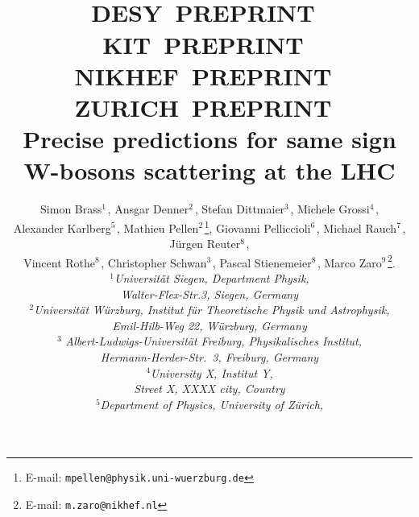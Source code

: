 \documentclass[11pt,epsf]{article}
\begin{document}
\title{\hfill ~\\[-30mm]
\phantom{h} \hfill\mbox{\small DESY PREPRINT } \\
\vspace{-10mm}
\phantom{h} \hfill\mbox{\small KIT PREPRINT } \\
\vspace{-10mm}
\phantom{h} \hfill\mbox{\small NIKHEF PREPRINT } \\
\vspace{-10mm}
\phantom{h} \hfill\mbox{\small ZURICH PREPRINT }
\\[1cm]
\textbf{Precise predictions for same sign W-bosons scattering at the LHC}}

\date{}
\author{
Simon Brass$^{1\,}$,
Ansgar Denner$^{2\,}$,
Stefan Dittmaier$^{3\,}$,
Michele Grossi$^{4\,}$, \\
Alexander Karlberg$^{5\,}$, 
Mathieu Pellen$^{2\,}$\footnote{E-mail:
  \texttt{mpellen@physik.uni-wuerzburg.de}},
Giovanni  Pelliccioli$^{6\,}$,
Michael Rauch$^{7\,}$,
J\"urgen Reuter$^{8\,}$, \\
Vincent Rothe$^{8\,}$, 
Christopher Schwan$^{3\,}$,
Pascal Stienemeier$^{8\,}$,
Marco Zaro$^{9\,}$\footnote{E-mail:
  \texttt{m.zaro@nikhef.nl}}.
\\[9mm]
{\small\it
$^1$Universit\"at Siegen, Department Physik,} \\ %
{\small\it Walter-Flex-Str.3,  Siegen, Germany}\\[3mm]
{\small\it
$^2$Universit\"at W\"urzburg, %
        Institut f\"ur Theoretische Physik und Astrophysik,} \\ %
{\small\it Emil-Hilb-Weg 22,  W\"urzburg, %
        Germany}\\[3mm]
$^3${\small\it
Albert-Ludwigs-Universit\"at Freiburg, Physikalisches Institut,} \\ %
{\small\it Hermann-Herder-Str.\ 3,  Freiburg, Germany}\\[3mm]
{\small\it
$^4$University X, %
        Institut Y,} \\ %
{\small\it Street X, \linebreak %
        XXXX city, %
        Country}\\[3mm]
{\small\it
$^5$Department of Physics, University of Z\"urich,} \\ %
}
\end{document}
